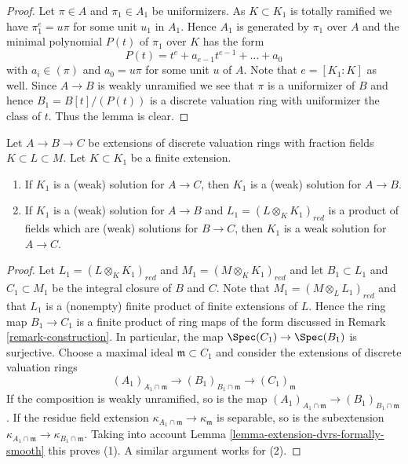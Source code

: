 \begin{proof}
Let $\pi \in A$ and $\pi_1 \in A_1$ be uniformizers. As $K \subset K_1$
is totally ramified we have $\pi_1^e = u \pi$ for some unit $u_1$ in $A_1$.
Hence $A_1$ is generated by $\pi_1$ over $A$ and the minimal polynomial
$P(t)$ of $\pi_1$ over $K$ has the form
$$
P(t) = t^e + a_{e - 1} t^{e - 1} + \ldots + a_0
$$
with $a_i \in (\pi)$ and $a_0 = u\pi$ for some unit $u$ of $A$.
Note that $e = [K_1 : K]$ as well. Since $A \to B$ is weakly
unramified we see that $\pi$ is a uniformizer of $B$ and hence
$B_1 = B[t]/(P(t))$ is a discrete valuation ring with uniformizer
the class of $t$. Thus the lemma is clear.
\end{proof}

\begin{lemma}
\label{lemma-solutions-go-down}
Let $A \to B \to C$ be extensions of discrete valuation rings with fraction
fields $K \subset L \subset M$. Let $K \subset K_1$ be a finite extension.
\begin{enumerate}
\item If $K_1$ is a (weak) solution for $A \to C$, then $K_1$ is a (weak)
solution for $A \to B$.
\item If $K_1$ is a (weak) solution for $A \to B$ and
$L_1 = (L \otimes_K K_1)_{red}$ is a product of fields which are
(weak) solutions for $B \to C$, then $K_1$ is a weak solution for $A \to C$.
\end{enumerate}
\end{lemma}

\begin{proof}
Let $L_1 = (L \otimes_K K_1)_{red}$ and $M_1 = (M \otimes_K K_1)_{red}$
and let $B_1 \subset L_1$ and $C_1 \subset M_1$ be the integral closure
of $B$ and $C$. Note that $M_1 = (M \otimes_L L_1)_{red}$ and that $L_1$
is a (nonempty) finite product of finite extensions of $L$. Hence the
ring map $B_1 \to C_1$ is a finite product of ring maps of the form discussed
in Remark \ref{remark-construction}. In particular, the map
$\Spec(C_1) \to \Spec(B_1)$ is surjective. Choose a maximal ideal
$\mathfrak m \subset C_1$ and consider the extensions of discrete
valuation rings
$$
(A_1)_{A_1 \cap \mathfrak m} \to
(B_1)_{B_1 \cap \mathfrak m} \to
(C_1)_\mathfrak m
$$
If the composition is weakly unramified, so is the map
$(A_1)_{A_1 \cap \mathfrak m} \to (B_1)_{B_1 \cap \mathfrak m}$.
If the residue field extension
$\kappa_{A_1 \cap \mathfrak m} \to \kappa_\mathfrak m$ is separable,
so is the subextension
$\kappa_{A_1 \cap \mathfrak m} \to \kappa_{B_1 \cap \mathfrak m}$.
Taking into account Lemma \ref{lemma-extension-dvrs-formally-smooth}
this proves (1). A similar argument works for (2).
\end{proof}

